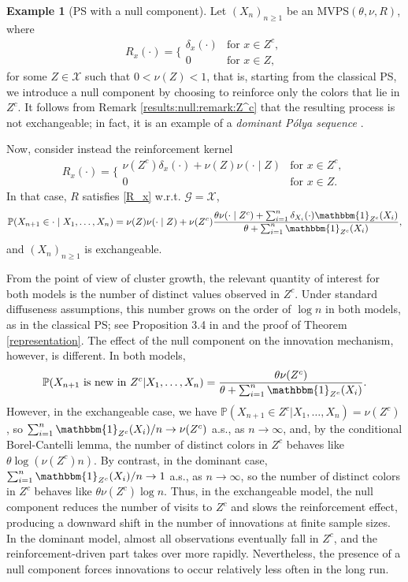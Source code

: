 \documentclass[a4paper]{article}
\theoremstyle{plain}
\theoremstyle{remark}
\theoremstyle{definition}
\newtheorem{example}[theorem]{Example}
\newcommand{\Polya}{P\'{o}lya }
\begin{document}
\begin{example}[PS with a null component]
Let $(X_n)_{n\geq1}$ be an MVPS$(\theta,\nu,R)$, where
\[R_x(\cdot)=\biggl\{\begin{array}{cl}\delta_x(\cdot) & \mbox{for }x\in Z^c,\\ 0 & \mbox{for }x\in Z,\end{array}\]
for some $Z\in\mathcal{X}$ such that $0<\nu(Z)<1$, that is, starting from the classical PS, we introduce a null component by choosing to reinforce only the colors that lie in $Z^c$. It follows from Remark \ref{results:null:remark:Z^c} that the resulting process is not exchangeable; in fact, it is an example of a \textit{dominant \Polya sequence} \citep{sariev2023}.

Now, consider instead the reinforcement kernel
\[R_x(\cdot)=\biggl\{\begin{array}{cl}\nu(Z^c)\delta_x(\cdot)+\nu(Z)\nu(\cdot\mid Z) & \mbox{for }x\in Z^c,\\ 0 & \mbox{for }x\in Z.\end{array}\]
In that case, $R$ satisfies \eqref{R_x} w.r.t. $\mathcal{G}=\mathcal{X}$,
\[\mathbb{P}(X_{n+1}\in\cdot\mid X_1,\ldots,X_n)=\nu(Z)\nu(\cdot\mid Z)+\nu(Z^c)\frac{\theta\nu(\cdot\mid Z^c)+\sum_{i=1}^n\delta_{X_i}(\cdot)\mathbbm{1}_{Z^c}(X_i)}{\theta+\sum_{i=1}^n\mathbbm{1}_{Z^c}(X_i)},\]
and $(X_n)_{n\geq1}$ is exchangeable.

From the point of view of cluster growth, the relevant quantity of interest for both models is the number of distinct values observed in $Z^c$. Under standard diffuseness assumptions, this number grows on the order of $\log n$ in both models, as in the classical PS; see Proposition 3.4 in \cite{sariev2023} and the proof of Theorem \ref{representation}. The effect of the null component on the innovation mechanism, however, is different. In both models,
\[\mathbb{P}(X_{n+1}\mbox{ is new in }Z^c|X_1,\ldots,X_n)=\frac{\theta\nu(Z^c)}{\theta+\sum_{i=1}^n\mathbbm{1}_{Z^c}(X_i)}.\]
However, in the exchangeable case, we have $\mathbb{P}(X_{n+1}\in Z^c|X_1,\ldots,X_n)=\nu(Z^c)$, so $\sum_{i=1}^n\mathbbm{1}_{Z^c}(X_i)/n\rightarrow\nu(Z^c)$ a.s., as $n\rightarrow\infty$, and, by the conditional Borel-Cantelli lemma, the number of distinct colors in $Z^c$ behaves like $\theta\log(\nu(Z^c)n)$. By contrast, in the dominant case, $\sum_{i=1}^n\mathbbm{1}_{Z^c}(X_i)/n\rightarrow1$ a.s., as $n\rightarrow\infty$, so the number of distinct colors in $Z^c$ behaves like $\theta\nu(Z^c)\log n$. Thus, in the exchangeable model, the null component reduces the number of visits to $Z^c$ and slows the reinforcement effect, producing a downward shift in the number of innovations at finite sample sizes. In the dominant model, almost all observations eventually fall in $Z^c$, and the reinforcement-driven part takes over more rapidly. Nevertheless, the presence of a null component forces innovations to occur relatively less often in the long run.
\end{example}
\end{document}
